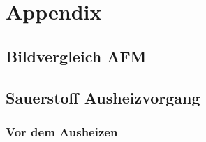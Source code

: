 \section{Appendix}\label{sec:appendix}

\subsection{Bildvergleich AFM}\label{subsec:bildvergleich-afm}

\subsection{Sauerstoff Ausheizvorgang}\label{subsec:sauerstoff-ausheizvorgang}

\subsubsection{Vor dem Ausheizen}
